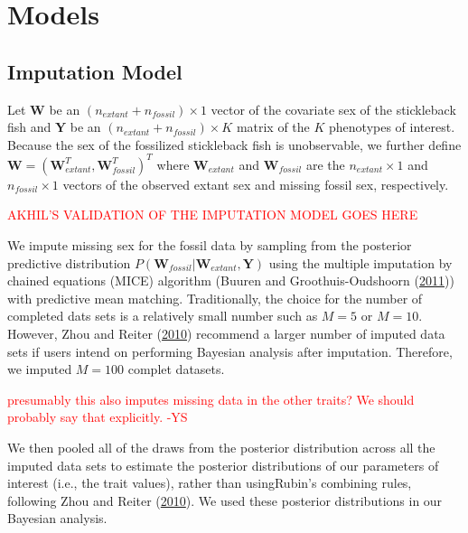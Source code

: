 \documentclass[
  12pt,
]{article}
\begin{document}
\hypertarget{sec:models}{%
\section{Models}\label{sec:models}}

\hypertarget{imputation-model}{%
\subsection{Imputation Model}\label{imputation-model}}

Let \(\boldsymbol{W}\) be an \((n_{extant} + n_{fossil}) \times 1\)
vector of the covariate sex of the stickleback fish and
\(\boldsymbol{Y}\) be an \((n_{extant} + n_{fossil}) \times K\) matrix
of the \(K\) phenotypes of interest. Because the sex of the fossilized
stickleback fish is unobservable, we further define
\(\boldsymbol{W} = (\boldsymbol{W}_{extant}^T,\boldsymbol{W}_{fossil}^T)^T\)
where \(\boldsymbol{W}_{extant}\) and \(\boldsymbol{W}_{fossil}\) are
the \(n_{extant} \times 1\) and \(n_{fossil} \times 1\) vectors of the
observed extant sex and missing fossil sex, respectively.

\textcolor{red}{AKHIL'S VALIDATION OF THE IMPUTATION MODEL GOES HERE}

We impute missing sex for the fossil data by sampling from the posterior
predictive distribution
\(P(\boldsymbol{W}_{fossil}|\boldsymbol{W}_{extant},\boldsymbol{Y})\)
using the multiple imputation by chained equations (MICE) algorithm
(Buuren and Groothuis-Oudshoorn (\protect\hyperlink{ref-MICE}{2011}))
with predictive mean matching. Traditionally, the choice for the number
of completed dats sets is a relatively small number such as \(M = 5\) or
\(M = 10\). However, Zhou and Reiter
(\protect\hyperlink{ref-ZhouReiter2010}{2010}) recommend a larger number
of imputed data sets if users intend on performing Bayesian analysis
after imputation. Therefore, we imputed \(M = 100\) complet datasets.

\textcolor{red}{presumably this also imputes missing data in the other traits? We should probably say that explicitly. -YS}

We then pooled all of the draws from the posterior distribution across
all the imputed data sets to estimate the posterior distributions of our
parameters of interest (i.e., the trait values), rather than
usingRubin's combining rules, following Zhou and Reiter
(\protect\hyperlink{ref-ZhouReiter2010}{2010}). We used these posterior
distributions in our Bayesian analysis.
\end{document}
